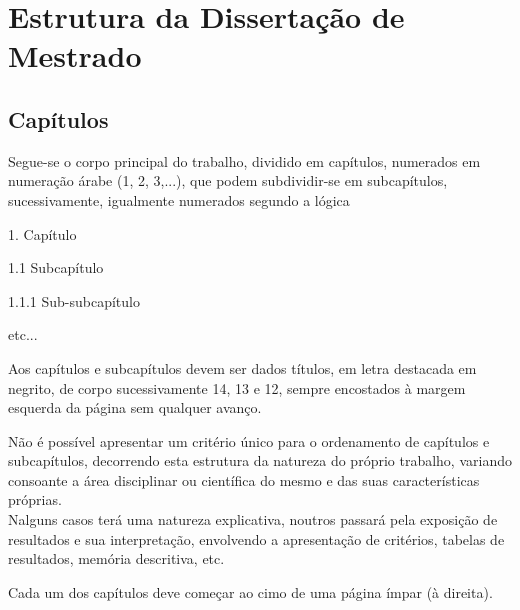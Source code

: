 % 
\chapter{Estrutura da Dissertação de Mestrado} %
\label{chap:Chapter1} %


%




\section{Capítulos}

Segue-se o corpo principal do trabalho, dividido em capítulos, numerados em numeração árabe (1, 2, 3,...), que podem subdividir-se em subcapítulos, sucessivamente, igualmente numerados segundo a lógica

1. Capítulo 

1.1 Subcapítulo 

1.1.1 Sub-subcapítulo 

etc...

Aos capítulos e subcapítulos devem ser dados títulos, em letra destacada em negrito, de corpo sucessivamente 14, 13 e 12, sempre encostados à margem esquerda da página sem qualquer avanço.

Não é possível apresentar um critério único para o ordenamento de capítulos e subcapítulos, decorrendo esta estrutura da natureza do próprio trabalho, variando consoante a área disciplinar ou científica do mesmo e das suas características próprias.\\
Nalguns casos terá uma natureza explicativa, noutros passará pela exposição de resultados e sua interpretação, envolvendo a apresentação de critérios, tabelas de resultados, memória descritiva, etc.

Cada um dos capítulos deve começar ao cimo de uma página ímpar (à direita).
